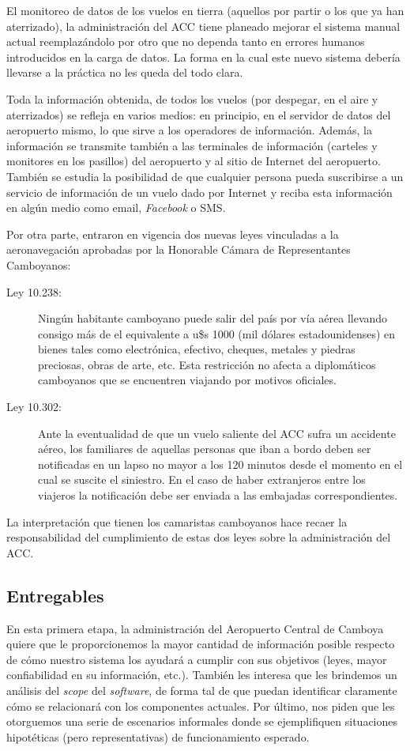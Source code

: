 El monitoreo de datos de los vuelos en tierra (aquellos por partir o los que ya han aterrizado), la administración del ACC tiene planeado mejorar el sistema manual actual reemplazándolo por otro que no dependa tanto en errores humanos introducidos en la carga de datos. La forma en la cual este nuevo sistema debería llevarse a la práctica no les queda del todo clara.

Toda la información obtenida, de todos los vuelos (por despegar, en el aire y aterrizados) se refleja en varios medios: en principio, en el servidor de datos del aeropuerto mismo, lo que sirve a los operadores de información. Además, la información se transmite también a las terminales de información (carteles y monitores en los pasillos) del aeropuerto y al sitio de Internet del aeropuerto. También se estudia la posibilidad de que cualquier persona pueda suscribirse a un servicio de información de un vuelo dado por Internet y reciba esta información en algún medio como email, \emph{Facebook} o SMS.

Por otra parte, entraron en vigencia dos nuevas leyes vinculadas a la aeronavegación aprobadas por la Honorable Cámara de Representantes Camboyanos:
\begin{description}
 \item[Ley 10.238:] Ningún habitante camboyano puede salir del país por vía aérea llevando consigo más de el equivalente a u\$s 1000 (mil dólares estadounidenses) en bienes tales como electrónica, efectivo, cheques, metales y piedras preciosas, obras de arte, etc. Esta restricción no afecta a diplomáticos camboyanos que se encuentren viajando por motivos oficiales. 
 \item[Ley 10.302:] Ante la eventualidad de que un vuelo saliente del ACC sufra un accidente aéreo, los familiares de aquellas personas que iban a bordo deben ser notificadas en un lapso no mayor a los 120 minutos desde el momento en el cual se suscite el siniestro. En el caso de haber extranjeros entre los viajeros la notificación debe ser enviada a las embajadas correspondientes.
\end{description}
La interpretación que tienen los camaristas camboyanos hace recaer la responsabilidad del cumplimiento de estas dos leyes sobre la administración del ACC.

\subsection{Entregables}
En esta primera etapa, la administración del Aeropuerto Central de Camboya quiere que le proporcionemos la mayor cantidad de información posible respecto de cómo nuestro sistema los ayudará a cumplir con sus objetivos (leyes, mayor confiabilidad en su información, etc.). También les interesa que les brindemos un análisis del \emph{scope} del \emph{software}, de forma tal de que puedan identificar claramente cómo se relacionará con los componentes actuales. Por último, nos piden que les otorguemos una serie de escenarios informales donde se ejemplifiquen situaciones hipotéticas (pero representativas) de funcionamiento esperado.
\newpage
